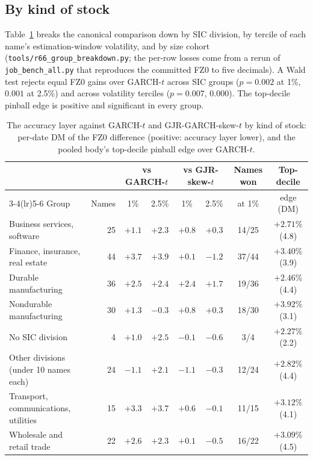 \subsection*{By kind of stock}
Table~\ref{tab:groups} breaks the canonical comparison down by SIC division, by tercile of each name's estimation-window volatility, and by size cohort (\texttt{tools/r66\_group\_breakdown.py}; the per-row losses come from a rerun of \texttt{job\_bench\_all.py} that reproduces the committed FZ0 to five decimals). A Wald test rejects equal FZ0 gains over GARCH-$t$ across SIC groups ($p=0.002$ at 1\%, $0.001$ at 2.5\%) and across volatility terciles ($p=0.007$, $0.000$). The top-decile pinball edge is positive and significant in every group.

\begin{table}[htbp]\centering\begin{threeparttable}
\caption{The accuracy layer against GARCH-$t$ and GJR-GARCH-skew-$t$ by kind of stock: per-date DM of the FZ0 difference (positive: accuracy layer lower), and the pooled body's top-decile pinball edge over GARCH-$t$.}\label{tab:groups}\footnotesize\setlength{\tabcolsep}{4pt}
\begin{tabular}{lrcccccc}\toprule
 & & \multicolumn{2}{c}{vs GARCH-$t$} & \multicolumn{2}{c}{vs GJR-skew-$t$} & Names won & Top-decile \\ \cmidrule(lr){3-4}\cmidrule(lr){5-6}
Group & Names & 1\% & 2.5\% & 1\% & 2.5\% & at 1\% & edge (DM) \\ \midrule
Business services, software & 25 & $+1.1$ & $+2.3$ & $+0.8$ & $+0.3$ & 14/25 & $+2.71\%$ (4.8) \\
Finance, insurance, real estate & 44 & $+3.7$ & $+3.9$ & $+0.1$ & $-1.2$ & 37/44 & $+3.40\%$ (3.9) \\
Durable manufacturing & 36 & $+2.5$ & $+2.4$ & $+2.4$ & $+1.7$ & 19/36 & $+2.46\%$ (4.4) \\
Nondurable manufacturing & 30 & $+1.3$ & $-0.3$ & $+0.8$ & $+0.3$ & 18/30 & $+3.92\%$ (3.1) \\
No SIC division & 4 & $+1.0$ & $+2.5$ & $-0.1$ & $-0.6$ & 3/4 & $+2.27\%$ (2.2) \\
Other divisions (under 10 names each) & 24 & $-1.1$ & $+2.1$ & $-1.1$ & $-0.3$ & 12/24 & $+2.82\%$ (4.4) \\
Transport, communications, utilities & 15 & $+3.3$ & $+3.7$ & $+0.6$ & $-0.1$ & 11/15 & $+3.12\%$ (4.1) \\
Wholesale and retail trade & 22 & $+2.6$ & $+2.3$ & $+0.1$ & $-0.5$ & 16/22 & $+3.09\%$ (4.5) \\

\end{tabular}
\end{threeparttable}
\end{table}
